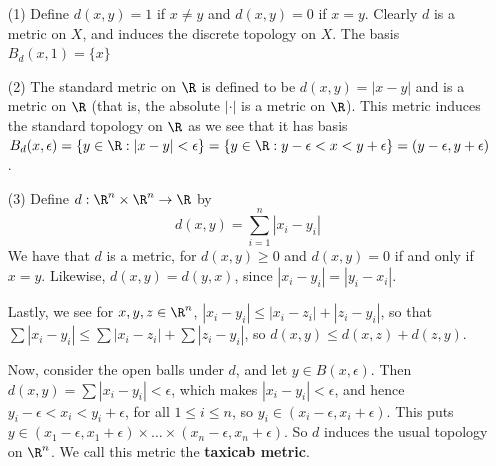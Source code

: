 \begin{example}
    \begin{enumerate}
        \item[(1)] Define $d(x,y)=1$ if $x \neq y$ and  $d(x,y)=0$ if $x=y$.
            Clearly  $d$ is a metric on $X$, and induces the discrete topology on
            $X$. The basis  $B_d(x,1)=\{x\}$

        \item[(2)] The standard metric on $\R$ is defined to be  $d(x,y)=|x-y|$
            and is a metric on $\R$ (that is, the absolute $|\cdot|$ is a metric
            on  $\R$). This metric induces the standard topology on $\R$ as we
            see that it has basis $B_d(x,\epsilon)=\{y \in \R: |x-y|<\epsilon\}=
            \{y \in \R: y-\epsilon<x<y+\epsilon\}=(y-\epsilon,y+\epsilon)$.

        \item[(3)] Define $d:\R^n \times \R^n \rightarrow \R$ by
            \begin{equation*}
                d(x,y)=\sum_{i=1}^n{|x_i-y_i|}
            \end{equation*}
            We have that $d$ is a metric, for  $d(x,y) \geq 0$ and $d(x,y)=0$ if
            and only if $x=y$. Likewise, $d(x,y)=d(y,x)$, since
            $|x_i-y_i|=|y_i-x_i|$.

            Lastly, we see for  $x,y,z \in \R^n$,  $|x_i-y_i| \leq
            |x_i-z_i|+|z_i-y_i|$, so that $\sum{|x_i-y_i|} \leq \sum{|x_i-z_i|}+
            \sum{|z_i-y_i|}$, so $d(x,y) \leq d(x,z)+d(z,y)$.

            Now, consider the open balls under $d$, and let  $y \in B(x,
            \epsilon)$. Then $d(x,y)=\sum{|x_i-y_i|}<\epsilon$, which makes
            $|x_i-y_i|<\epsilon$, and hence  $y_i-\epsilon < x_i <
            y_i+\epsilon$, for all $1 \leq i \leq n$, so $y_i \in
            (x_i-\epsilon,x_i+\epsilon)$. This puts $y \in
            (x_1-\epsilon,x_1+\epsilon) \times \dots \times
            (x_n-\epsilon,x_n+\epsilon)$. So $d$ induces the usual topology on
            $\R^n$. We call this metric the \textbf{taxicab metric}.


\end{enumerate}
\end{example}
